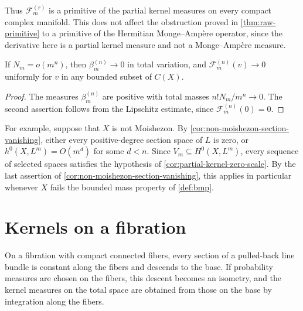 Thus $\mathcal F_m^{(r)}$ is a primitive of the partial kernel measures on every compact complex manifold. This does not affect the obstruction proved in \cref{thm:raw-primitive} to a primitive of the Hermitian Monge--Amp\`ere operator, since the derivative here is a partial kernel measure and not a Monge--Amp\`ere measure.

\begin{corollary}\label{cor:partial-kernel-zero-scale}
If $N_m=o(m^n)$, then $\beta_m^{(n)}\to0$ in total variation, and $\mathcal F_m^{(n)}(v)\to0$ uniformly for $v$ in any bounded subset of $C(X)$.
\end{corollary}
\begin{proof}
The measures $\beta_m^{(n)}$ are positive with total masses $n!N_m/m^n\to0$. The second assertion follows from the Lipschitz estimate, since $\mathcal F_m^{(n)}(0)=0$.
\end{proof}

For example, suppose that $X$ is not Moishezon. By \cref{cor:non-moishezon-section-vanishing}, either every positive-degree section space of $L$ is zero, or $h^0(X,L^m)=O(m^d)$ for some $d<n$. Since $V_m\subseteq H^0(X,L^m)$, every sequence of selected spaces satisfies the hypothesis of \cref{cor:partial-kernel-zero-scale}. By the last assertion of \cref{cor:non-moishezon-section-vanishing}, this applies in particular whenever $X$ fails the bounded mass property of \cref{def:bmp}.







\section{Kernels on a fibration}\label{sec:partial-submersion}

On a fibration with compact connected fibers, every section of a pulled-back line bundle is constant along the fibers and descends to the base. If probability measures are chosen on the fibers, this descent becomes an isometry, and the kernel measures on the total space are obtained from those on the base by integration along the fibers.

